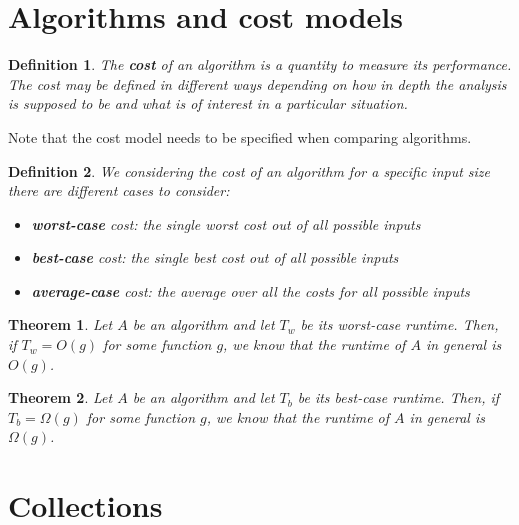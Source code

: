 \documentclass{article}
\theoremstyle{sltheorem}
\newtheorem{definition}{Definition}[section]
\newtheorem{theorem}{Theorem}[section]
\newcommand*\B[1]{\textbf{#1}}
\begin{document}
\section{Algorithms and cost models}
\begin{definition}
	The \B{cost} of an algorithm is a quantity to measure its performance.\\
	The cost may be defined in different ways depending on
	how in depth the analysis is supposed to be and what
	is of interest in a particular situation.
\end{definition}
Note that the cost model needs to be specified when comparing algorithms.
\begin{definition}
	We considering the cost of an algorithm for a specific input size there are different cases to consider:
	\begin{itemize}
		\item \B{worst-case} cost: the single worst cost out of all possible inputs
		\item \B{best-case} cost: the single best cost out of all possible inputs
		\item \B{average-case} cost: the average over all the costs for all possible inputs
	\end{itemize}
\end{definition}
\begin{theorem}
	Let $A$ be an algorithm and let $T_w$ be its worst-case runtime. Then, if $T_w=O(g)$ for some function $g$,
	we know that the runtime of $A$ \emph{in general} is $O(g)$.
\end{theorem}
\begin{theorem}
	Let $A$ be an algorithm and let $T_b$ be its best-case runtime. Then, if $T_b=\Omega(g)$ for some function $g$,
	we know that the runtime of $A$ \emph{in general} is $\Omega (g)$.
\end{theorem}
\section{Collections}
\end{document}
